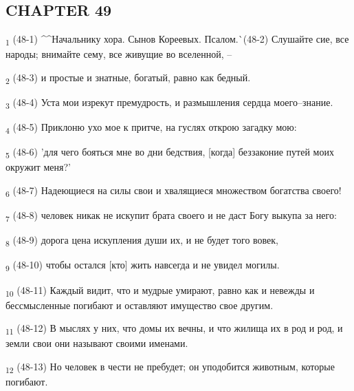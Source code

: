\subsection{CHAPTER 49}
\begin{tcolorbox}
\textsubscript{1} (48-1) ^^Начальнику хора. Сынов Кореевых. Псалом.^^ (48-2) Слушайте сие, все народы; внимайте сему, все живущие во вселенной, --
\end{tcolorbox}
\begin{tcolorbox}
\textsubscript{2} (48-3) и простые и знатные, богатый, равно как бедный.
\end{tcolorbox}
\begin{tcolorbox}
\textsubscript{3} (48-4) Уста мои изрекут премудрость, и размышления сердца моего--знание.
\end{tcolorbox}
\begin{tcolorbox}
\textsubscript{4} (48-5) Приклоню ухо мое к притче, на гуслях открою загадку мою:
\end{tcolorbox}
\begin{tcolorbox}
\textsubscript{5} (48-6) 'для чего бояться мне во дни бедствия, [когда] беззаконие путей моих окружит меня?'
\end{tcolorbox}
\begin{tcolorbox}
\textsubscript{6} (48-7) Надеющиеся на силы свои и хвалящиеся множеством богатства своего!
\end{tcolorbox}
\begin{tcolorbox}
\textsubscript{7} (48-8) человек никак не искупит брата своего и не даст Богу выкупа за него:
\end{tcolorbox}
\begin{tcolorbox}
\textsubscript{8} (48-9) дорога цена искупления души их, и не будет того вовек,
\end{tcolorbox}
\begin{tcolorbox}
\textsubscript{9} (48-10) чтобы остался [кто] жить навсегда и не увидел могилы.
\end{tcolorbox}
\begin{tcolorbox}
\textsubscript{10} (48-11) Каждый видит, что и мудрые умирают, равно как и невежды и бессмысленные погибают и оставляют имущество свое другим.
\end{tcolorbox}
\begin{tcolorbox}
\textsubscript{11} (48-12) В мыслях у них, что домы их вечны, и что жилища их в род и род, и земли свои они называют своими именами.
\end{tcolorbox}
\begin{tcolorbox}
\textsubscript{12} (48-13) Но человек в чести не пребудет; он уподобится животным, которые погибают.
\end{tcolorbox}
